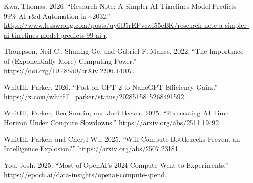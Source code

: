 \documentclass[
  11pt,
  letterpaper,
  DIV=11,
  numbers=noendperiod]{scrartcl}
\newlength{\cslhangindent}
\newenvironment{CSLReferences}[2] %
 {\begin{list}{}{%
  \setlength{\itemindent}{0pt}
  \setlength{\leftmargin}{0pt}
  \setlength{\parsep}{0pt}
  \ifodd #1
   \setlength{\leftmargin}{\cslhangindent}
   \setlength{\itemindent}{-1\cslhangindent}
  \fi
  \setlength{\itemsep}{#2\baselineskip}}}
 {\end{list}}
\begin{document}
\begin{CSLReferences}{1}{0}
Kwa, Thomas. 2026. {``Research Note: A Simpler AI Timelines Model
Predicts 99\% AI r\&d Automation in \textasciitilde2032.''}
\url{https://www.lesswrong.com/posts/uy6B5rEPvcwi55cBK/research-note-a-simpler-ai-timelines-model-predicts-99-ai-r}.

Thompson, Neil C., Shuning Ge, and Gabriel F. Manso. 2022. {``The
Importance of (Exponentially More) Computing Power.''}
\url{https://doi.org/10.48550/arXiv.2206.14007}.

Whitfill, Parker. 2026. {``Post on {GPT}-2 to Nano{GPT} Efficiency
Gains.''}
\url{https://x.com/whitfill_parker/status/2028515815268491592}.

Whitfill, Parker, Ben Snodin, and Joel Becker. 2025. {``Forecasting AI
Time Horizon Under Compute Slowdowns.''}
\url{https://arxiv.org/abs/2511.19492}.

Whitfill, Parker, and Cheryl Wu. 2025. {``Will Compute Bottlenecks
Prevent an Intelligence Explosion?''}
\url{https://arxiv.org/abs/2507.23181}.

You, Josh. 2025. {``Most of OpenAI's 2024 Compute Went to
Experiments.''}
\url{https://epoch.ai/data-insights/openai-compute-spend}.

\end{CSLReferences}
\end{document}
